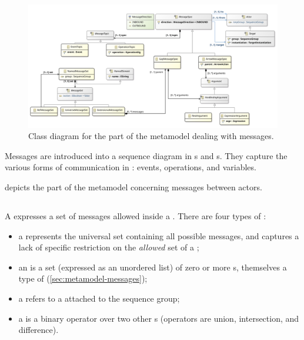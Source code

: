\begin{figure}[htb]
	\centering
	\includegraphics[width=\textwidth]{diagrams/Messages}
	\caption{Class diagram for the part of the \langname{} metamodel dealing with messages.}
	\label{fig:metamodel-messages}
\end{figure}

\noindent
Messages are introduced into a sequence diagram
in \mmessageset s and \marrowaction s.  They capture the various forms of
communication in \robochart: events, operations, and 
variables.

 depicts the part of the metamodel concerning
messages between actors.

\subsection{\mmessageset}\label{ssec:metamodel-messages-sets}

A \mmessageset{} expresses a set of messages allowed 
inside a \msequencegap.  There are four types of \mmessageset:

\begin{itemize}
\item
  a \muniversemessageset{} represents the universal set containing 
  all possible messages, and
  captures a lack of specific restriction on
  the \emph{allowed} set of a \msequencegap;
\item	
  an \mextensionalmessageset{} is a set (expressed as an unordered list) of
  zero or more \mgapmessagespec s, themselves
  a type of \mmessagespec{} (\cref{sec:metamodel-messages});
\item
  a \mrefmessageset{} refers to a \mnamedmessageset{} attached to the
  sequence group;
\item
  a \mbinarymessageset{} is a binary operator over two other \mmessageset s
  (operators are union, intersection, and difference).
\end{itemize}

